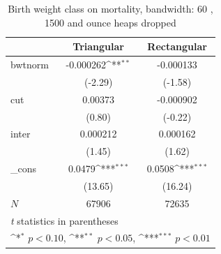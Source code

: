 \documentclass[a4paper,11pt]{article}
\begin{document}
\begin{table}[htbp]\centering
\def\sym#1{\ifmmode^{#1}\else\(^{#1}\)\fi}
\caption{Birth weight class on mortality, bandwidth: 60 , 1500 and ounce heaps dropped}
\label{B3.bw60}
\begin{tabular}{l*{2}{c}}
\hline\hline
            &\multicolumn{1}{c}{Triangular}&\multicolumn{1}{c}{Rectangular}\\
\hline
bwtnorm     &   -0.000262\sym{**} &   -0.000133         \\
            &     (-2.29)         &     (-1.58)         \\
[1em]
cut         &     0.00373         &   -0.000902         \\
            &      (0.80)         &     (-0.22)         \\
[1em]
inter       &    0.000212         &    0.000162         \\
            &      (1.45)         &      (1.62)         \\
[1em]
\_cons      &      0.0479\sym{***}&      0.0508\sym{***}\\
            &     (13.65)         &     (16.24)         \\
\hline
\(N\)       &       67906         &       72635         \\
\hline\hline
\multicolumn{3}{l}{\footnotesize \textit{t} statistics in parentheses}\\
\multicolumn{3}{l}{\footnotesize \sym{*} \(p<0.10\), \sym{**} \(p<0.05\), \sym{***} \(p<0.01\)}\\
\end{tabular}
\end{table}


\end{document}
